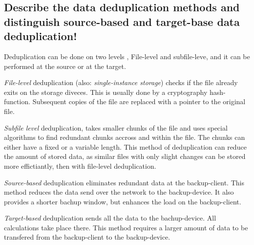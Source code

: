 \documentclass{article}
\begin{document}
\subsection{Describe the data deduplication methods and distinguish source-based and target-base data deduplication!}
	Deduplication can be done on two levels , File-level and subfile-leve,
	and it can be performed at the source or at the target.

	\emph{File-level} deduplication (also: \textsl{single-instance storage}) 
	checks if the file already exits on the storage diveces.
	This is usually done by a cryptography hash-function.
	Subsequent copies of the file are replaced with a pointer to the original file.

	\emph{Subfile level} deduplication,
	takes smaller chunks of the file
	and uses special algorithms to find redundant chunks accross and within the file.
	The chunks can either have a fixed or a variable length.
	This method of deduplication can reduce the amount of stored data,
	as similar files with only slight changes can be stored more effictiantly,
	then with file-level deduplication.

	\emph{Source-based} deduplication eliminates redundant data at the backup-client.
	This method reduces the data send over the network to the backup-device.
	It also provides a shorter bachup window,
	but enhances the load on the backup-client.

	\emph{Target-based} deduplication sends all the data to the bachup-device.
	All calculations take place there.
	This method requires a larger amount of data to be transfered from
	the backup-client to the backup-device.
\end{document}
